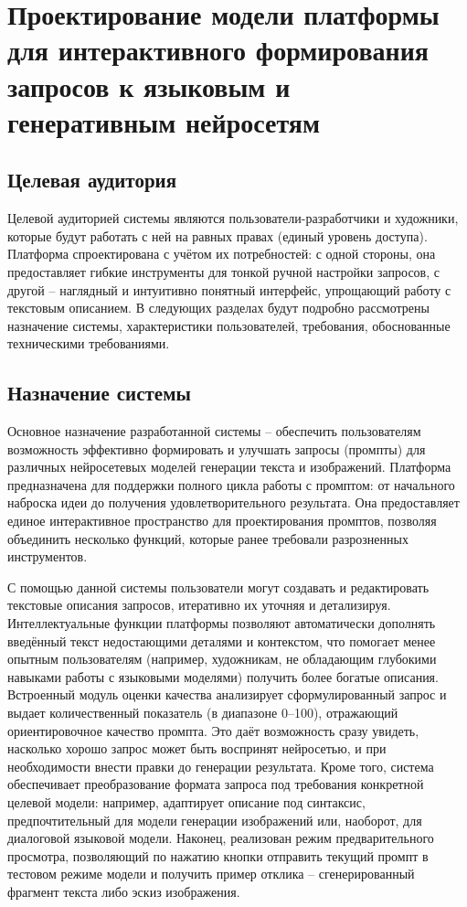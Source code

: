\section{Проектирование модели платформы для интерактивного формирования
запросов к языковым и генеративным нейросетям}
\label{sec:designing}
\subsection{Целевая аудитория}
Целевой аудиторией системы являются пользователи-разработчики и художники, которые будут работать с ней на равных правах (единый уровень доступа). Платформа спроектирована с учётом их потребностей: с одной стороны, она предоставляет гибкие инструменты для тонкой ручной настройки запросов, с другой – наглядный и интуитивно понятный интерфейс, упрощающий работу с текстовым описанием. В следующих разделах будут подробно рассмотрены назначение системы, характеристики пользователей, требования, обоснованные техническими требованиями.

\subsection{Назначение системы}
Основное назначение разработанной системы – обеспечить пользователям возможность эффективно формировать и улучшать запросы (промпты) для различных нейросетевых моделей генерации текста и изображений.
Платформа предназначена для поддержки полного цикла работы с промптом: от начального наброска идеи до получения удовлетворительного результата. Она предоставляет единое интерактивное пространство для проектирования промптов, позволяя объединить несколько функций, которые ранее требовали разрозненных инструментов.

С помощью данной системы пользователи могут создавать и редактировать текстовые описания запросов, итеративно их уточняя и детализируя. Интеллектуальные функции платформы позволяют автоматически дополнять введённый текст недостающими деталями и контекстом, что помогает менее опытным пользователям (например, художникам, не обладающим глубокими навыками работы с языковыми моделями) получить более богатые описания. Встроенный модуль оценки качества анализирует сформулированный запрос и выдает количественный показатель (в диапазоне 0–100), отражающий ориентировочное качество промпта. Это даёт возможность сразу увидеть, насколько хорошо запрос может быть воспринят нейросетью, и при необходимости внести правки до генерации результата. Кроме того, система обеспечивает преобразование формата запроса под требования конкретной целевой модели: например, адаптирует описание под синтаксис, предпочтительный для модели генерации изображений или, наоборот, для диалоговой языковой модели. Наконец, реализован режим предварительного просмотра, позволяющий по нажатию кнопки отправить текущий промпт в тестовом режиме модели и получить пример отклика – сгенерированный фрагмент текста либо эскиз изображения.

